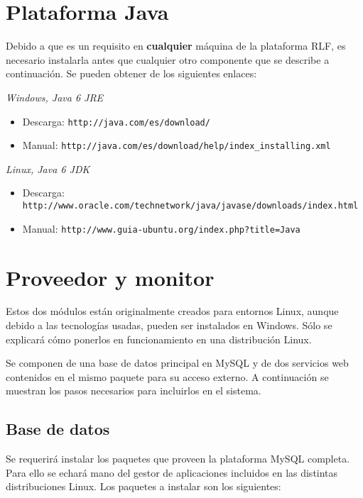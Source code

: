 

\section*{Plataforma Java}
Debido  a que es un requisito en \textbf{cualquier} máquina de la 
plataforma RLF, es necesario instalarla antes que cualquier otro 
componente que se describe a continuación. Se pueden obtener de los 
siguientes enlaces:

\textit{Windows, Java 6 JRE}
\begin{itemize}
\item Descarga: \texttt{http://java.com/es/download/}
\item Manual: \texttt{http://java.com/es/download/help/index\_installing.xml}
\end{itemize}

\textit{Linux, Java 6 JDK}
\begin{itemize}
\item Descarga: \texttt{http://www.oracle.com/technetwork/java/javase/downloads/index.html}
\item Manual: \texttt{http://www.guia-ubuntu.org/index.php?title=Java}
\end{itemize}

\section*{Proveedor y monitor}
Estos dos módulos están originalmente creados para entornos Linux, 
aunque debido a las tecnologías usadas, pueden ser instalados en 
Windows. Sólo se explicará cómo ponerlos en funcionamiento en una 
distribución Linux.

Se componen de una base de datos principal en MySQL y de dos servicios 
web contenidos en el mismo paquete para su acceso externo. A 
continuación se muestran los pasos necesarios para incluirlos en el 
sistema.

\subsection*{Base de datos}
Se requerirá instalar los paquetes que proveen la plataforma MySQL 
completa. Para ello se echará mano del gestor de aplicaciones 
incluidos en las distintas distribuciones Linux. Los paquetes a 
instalar son los siguientes:

